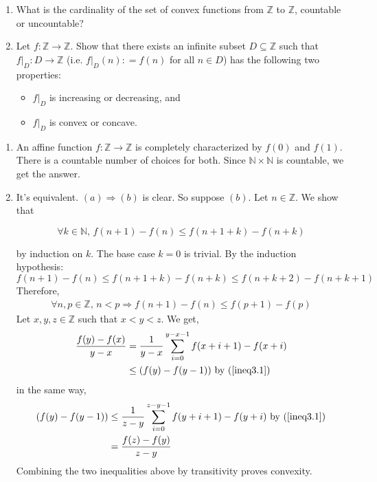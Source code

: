 \documentclass[a4paper,11pt]{exam}
\newcommand{\Z}{\mathbb{Z}}
\newcommand{\N}{\mathbb{N}}
\begin{document}
\begin{questions}
\begin{enumerate}
			
			\item  What is the cardinality of the set of convex functions from $ \Z $ to $ \Z $, countable or uncountable?
			
			\item Let $ f: \Z \to \Z $. Show that there exists an infinite subset $ D \subseteq \Z $ such that $ f|_D: D \to \Z $ (i.e. $ f|_D(n): = f (n) $ for all $ n \in D $) has the following two properties:
			\begin{itemize}
				\item $f|_D$ is increasing or decreasing, and
				\item $f|_D$ is convex or concave.
			\end{itemize}
		\end{enumerate}
		
		
		\begin{solution}
			\begin{enumerate}
				\item An affine function $ f: \Z \to \Z $ is completely characterized by $ f (0) $ and $ f (1) $. There is a countable number of choices for both. Since $ \N \times \N $ is countable, we get the answer.
				
				\item It's equivalent. $ (a) \Rightarrow (b) $ is clear. So suppose $ (b) $. Let $ n \in \Z $. We show that
				
				$$ \forall k \in \N, \, f(n + 1) -f (n) \leq f (n + 1 + k) - f(n + k) $$
				
				by induction on $ k $. The base case $ k = 0 $ is trivial. By the induction hypothesis:
				$$ f (n + 1) -f (n) \leq f (n + 1 + k) - f (n + k) \leq f (n + k + 2) - f (n + k +1) $$ 
				Therefore,
				\begin{align}
				\forall n,p \in \Z,\,n < p \Rightarrow f(n+1)-f(n) \leq f(p+1) -f(p) \label{ineq3.1} 
				\end{align}
				Let $x,y,z \in \Z$ such that $x < y < z$. We get,
				\begin{align*}
				\frac{f(y)- f(x)}{y-x} & = \frac{1}{y-x}\sum_{i = 0}^{y-x-1}f(x+i+1)-f(x+i)\\
				& \leq (f(y) - f(y-1)) \mbox{ by (\ref{ineq3.1})}
				\end{align*}
				in the same way,
				\begin{align*}
				(f(y) - f(y-1)) &\leq \frac{1}{z-y} \sum_{i = 0}^{z-y-1} f(y+i+1) - f(y + i) \mbox{ by (\ref{ineq3.1})}\\
				& = \frac{f(z) - f(y)}{z-y}
				\end{align*}
				Combining the two inequalities above by transitivity proves convexity. 
				

\end{enumerate}
\end{solution}
\end{questions}
\end{document}
